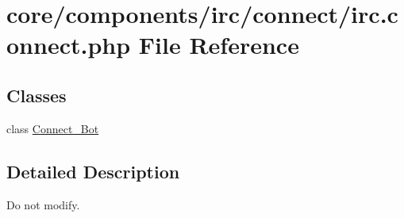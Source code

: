 \hypertarget{irc_8connect_8php}{}\section{core/components/irc/connect/irc.connect.\+php File Reference}
\label{irc_8connect_8php}
\subsection*{Classes}
\begin{DoxyCompactItemize}
\item 
class \hyperlink{classConnect__Bot}{Connect\+\_\+\+Bot}
\end{DoxyCompactItemize}


\subsection{Detailed Description}
Do not modify. 